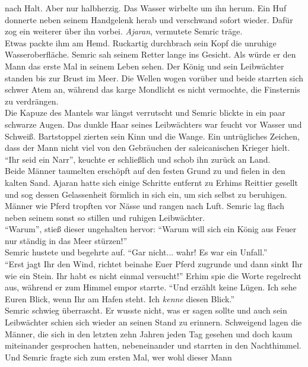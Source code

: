 nach Halt. Aber nur 
halbherzig. Das Wasser wirbelte um ihn herum. Ein Huf donnerte neben seinem 
Handgelenk herab und 
verschwand sofort wieder. Dafür zog ein weiterer über ihn vorbei. 
\textit{Ajaran}, vermutete Semric 
träge. \\
Etwas packte ihm am Hemd. Ruckartig durchbrach sein Kopf die unruhige 
Wasseroberfläche. Semric sah 
seinem Retter lange ins Gesicht. Als würde er den Mann das erste Mal in seinem 
Leben sehen. Der 
König und sein Leibwächter standen bis zur Brust im Meer. Die Wellen wogen 
vorüber und beide 
starrten sich schwer Atem an, während das karge Mondlicht es nicht vermochte, 
die Finsternis zu 
verdrängen. \\
Die Kapuze des Mantels war längst verrutscht und Semric blickte in ein paar 
schwarze Augen. Das 
dunkle Haar seines Leibwächters war feucht vor Wasser und Schweiß. Bartstoppel 
zierten sein Kinn 
und die Wange. Ein untrügliches Zeichen, dass der Mann nicht viel von den 
Gebräuchen der 
saleicanischen Krieger hielt. \\
``Ihr seid ein Narr'', keuchte er schließlich und schob ihn zurück an Land. \\
Beide Männer taumelten erschöpft auf den festen Grund zu und fielen in den 
kalten Sand. Ajaran 
hatte sich einige Schritte entfernt zu Erhims Reittier gesellt und sog dessen 
Gelassenheit förmlich 
in sich ein, um sich selbst zu beruhigen. Männer wie Pferd tropften vor Nässe 
und rangen nach Luft. 
Semric lag flach neben seinem sonst so stillen und ruhigen Leibwächter. \\
``Warum'', stieß dieser ungehalten hervor: ``Warum will sich ein König aus 
Feuer nur ständig in das 
Meer stürzen!''\\
Semric hustete und begehrte auf. ``Gar nicht... wahr! Es war ein Unfall.''\\
``Erst jagt Ihr den Wind, richtet beinahe Euer Pferd zugrunde und dann sinkt 
Ihr wie ein Stein. Ihr 
habt es nicht einmal versucht!'' Erhim spie die Worte regelrecht aus, während 
er zum Himmel empor 
starrte. ``Und erzählt keine Lügen. Ich sehe Euren Blick, wenn Ihr am Hafen 
steht. Ich \emph{kenne} 
diesen Blick.''\\
Semric schwieg überrascht. Er wusste nicht, was er sagen sollte und auch sein 
Leibwächter schien 
sich wieder an seinen Stand zu erinnern. Schweigend lagen die Männer, die sich 
in den letzten zehn 
Jahren jeden Tag gesehen und doch kaum miteinander gesprochen hatten, 
nebeneinander und starrten in 
den Nachthimmel. Und Semric fragte sich zum ersten Mal, wer wohl dieser Mann 
